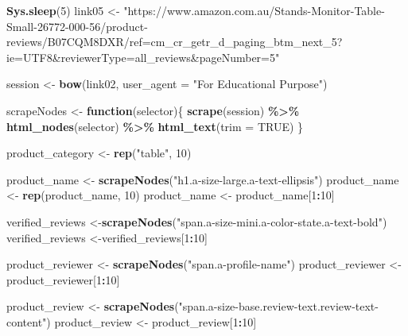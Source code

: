 \documentclass[
]{article}
\newenvironment{Shaded}{\begin{snugshade}}{\end{snugshade}}
\newcommand{\AttributeTok}[1]{\textcolor[rgb]{0.13,0.29,0.53}{#1}}
\newcommand{\ConstantTok}[1]{\textcolor[rgb]{0.56,0.35,0.01}{#1}}
\newcommand{\ControlFlowTok}[1]{\textcolor[rgb]{0.13,0.29,0.53}{\textbf{#1}}}
\newcommand{\DecValTok}[1]{\textcolor[rgb]{0.00,0.00,0.81}{#1}}
\newcommand{\FunctionTok}[1]{\textcolor[rgb]{0.13,0.29,0.53}{\textbf{#1}}}
\newcommand{\NormalTok}[1]{#1}
\newcommand{\OtherTok}[1]{\textcolor[rgb]{0.56,0.35,0.01}{#1}}
\newcommand{\SpecialCharTok}[1]{\textcolor[rgb]{0.81,0.36,0.00}{\textbf{#1}}}
\newcommand{\StringTok}[1]{\textcolor[rgb]{0.31,0.60,0.02}{#1}}
\begin{document}
\begin{Shaded}
\begin{Highlighting}[]
   \FunctionTok{Sys.sleep}\NormalTok{(}\DecValTok{5}\NormalTok{)}
\NormalTok{link05 }\OtherTok{\textless{}{-}} \StringTok{"https://www.amazon.com.au/Stands{-}Monitor{-}Table{-}Small{-}26772{-}000{-}56/product{-}reviews/B07CQM8DXR/ref=cm\_cr\_getr\_d\_paging\_btm\_next\_5?ie=UTF8\&reviewerType=all\_reviews\&pageNumber=5"}


\NormalTok{  session }\OtherTok{\textless{}{-}} \FunctionTok{bow}\NormalTok{(link02,}
               \AttributeTok{user\_agent =} \StringTok{"For Educational Purpose"}\NormalTok{)}

\NormalTok{  scrapeNodes }\OtherTok{\textless{}{-}} \ControlFlowTok{function}\NormalTok{(selector)\{}
    \FunctionTok{scrape}\NormalTok{(session) }\SpecialCharTok{\%\textgreater{}\%}
      \FunctionTok{html\_nodes}\NormalTok{(selector) }\SpecialCharTok{\%\textgreater{}\%}
      \FunctionTok{html\_text}\NormalTok{(}\AttributeTok{trim =} \ConstantTok{TRUE}\NormalTok{)}
\NormalTok{  \}}

\NormalTok{  product\_category }\OtherTok{\textless{}{-}} \FunctionTok{rep}\NormalTok{(}\StringTok{"table"}\NormalTok{, }\DecValTok{10}\NormalTok{)}

\NormalTok{  product\_name }\OtherTok{\textless{}{-}} \FunctionTok{scrapeNodes}\NormalTok{(}\StringTok{"h1.a{-}size{-}large.a{-}text{-}ellipsis"}\NormalTok{)}
\NormalTok{  product\_name }\OtherTok{\textless{}{-}} \FunctionTok{rep}\NormalTok{(product\_name, }\DecValTok{10}\NormalTok{)}
\NormalTok{  product\_name }\OtherTok{\textless{}{-}}\NormalTok{ product\_name[}\DecValTok{1}\SpecialCharTok{:}\DecValTok{10}\NormalTok{]}
  
\NormalTok{  verified\_reviews }\OtherTok{\textless{}{-}}\FunctionTok{scrapeNodes}\NormalTok{(}\StringTok{"span.a{-}size{-}mini.a{-}color{-}state.a{-}text{-}bold"}\NormalTok{)}
\NormalTok{  verified\_reviews }\OtherTok{\textless{}{-}}\NormalTok{verified\_reviews[}\DecValTok{1}\SpecialCharTok{:}\DecValTok{10}\NormalTok{]}
  
\NormalTok{  product\_reviewer }\OtherTok{\textless{}{-}} \FunctionTok{scrapeNodes}\NormalTok{(}\StringTok{"span.a{-}profile{-}name"}\NormalTok{)}
\NormalTok{  product\_reviewer }\OtherTok{\textless{}{-}}\NormalTok{ product\_reviewer[}\DecValTok{1}\SpecialCharTok{:}\DecValTok{10}\NormalTok{]}
  
\NormalTok{  product\_review }\OtherTok{\textless{}{-}} \FunctionTok{scrapeNodes}\NormalTok{(}\StringTok{"span.a{-}size{-}base.review{-}text.review{-}text{-}content"}\NormalTok{)}
\NormalTok{  product\_review }\OtherTok{\textless{}{-}}\NormalTok{ product\_review[}\DecValTok{1}\SpecialCharTok{:}\DecValTok{10}\NormalTok{]}
  

\end{Highlighting}
\end{Shaded}
\end{document}
